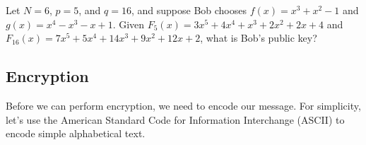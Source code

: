 \begin{exercise}
    Let $N = 6$, $p = 5$, and $q = 16$, and suppose Bob chooses $f(x) = x^3 + x^2 - 1$ and $g(x) = x^4 - x^3 - x + 1$. Given $F_5(x) = 3x^5 + 4x^4 + x^3 + 2x^2 + 2x + 4$ and $F_{16}(x) = 7x^5 + 5x^4 + 14x^3 + 9x^2 + 12x + 2$, what is Bob's public key?
\end{exercise}

\subsection{Encryption}
Before we can perform encryption, we need to encode our message. For simplicity, let's use the American Standard Code for Information Interchange (ASCII) to encode simple alphabetical text.


